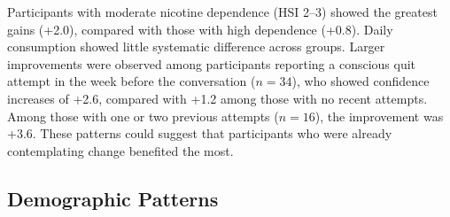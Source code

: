 Participants with moderate nicotine dependence (HSI 2--3) showed the greatest gains (+2.0), compared with those with high dependence  (+0.8). Daily consumption showed little systematic difference across groups. Larger improvements were observed among participants reporting a conscious quit attempt in the week before the conversation ($n=34$), who showed confidence increases of +2.6, compared with +1.2 among those with no recent attempts. Among those with one or two previous attempts ($n=16$), the improvement was +3.6. These patterns could suggest that participants who were already contemplating change benefited the most.

\subsection*{Demographic Patterns}

